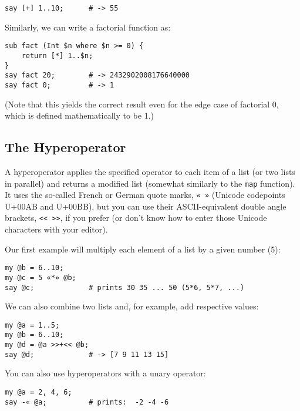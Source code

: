 \begin{verbatim}
say [+] 1..10;      # -> 55
\end{verbatim}

Similarly, we can write a factorial function as:

\begin{verbatim}
sub fact (Int $n where $n >= 0) {
    return [*] 1..$n;
}
say fact 20;        # -> 2432902008176640000
say fact 0;         # -> 1
\end{verbatim}

(Note that this yields the correct result even for the 
edge case of factorial 0, which is defined mathematically 
to be 1.)

\subsection{The Hyperoperator}

A hyperoperator applies the specified operator to each 
item of a list (or two lists in parallel) and returns a 
modified list (somewhat similarly to the {\tt map} 
function). It uses the so-called French or German 
quote marks, \verb'« »' (Unicode codepoints U+00AB 
and U+00BB), but you can use their ASCII-equivalent 
double angle brackets, \verb'<< >>', if you prefer 
(or don't know how to enter those Unicode characters 
with your editor).

Our first example will multiply each element of a list 
by a given number (5):

\begin{verbatim}
my @b = 6..10;
my @c = 5 «*» @b;
say @c;             # prints 30 35 ... 50 (5*6, 5*7, ...)
\end{verbatim}

We can also combine two lists and, for example, add 
respective values:

\begin{verbatim}
my @a = 1..5;
my @b = 6..10;
my @d = @a >>+<< @b;
say @d;             # -> [7 9 11 13 15]
\end{verbatim}

You can also use hyperoperators with a unary operator:

\begin{verbatim}
my @a = 2, 4, 6;
say -« @a;          # prints:  -2 -4 -6
\end{verbatim}

